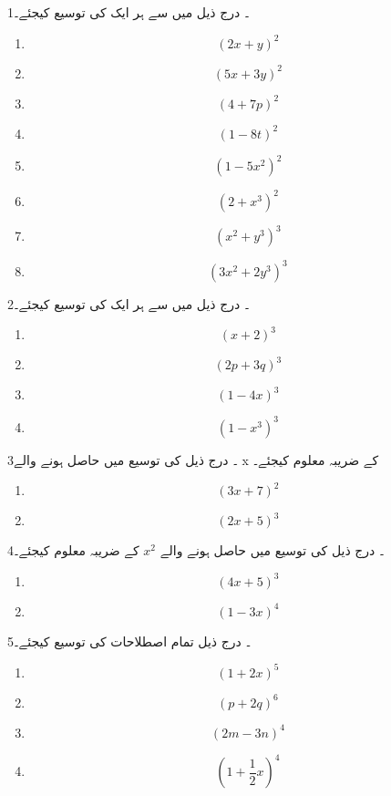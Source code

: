 1۔ درج ذیل میں سے ہر ایک کی توسیع کیجئے۔ 
\begin{multicols}{3}
\begin{enumerate}
\item
 \[ (2x+y)^{2}\]
 \item
    \[(5x+3y)^{2}\]
    \item
    \[(4+7p)^{2}\]
    \item
    \[(1-8t)^{2}\]
    \item
    \[(1-5x^{2})^{2}\]
    \item
    \[(2+x^{3})^{2}\]
    \item
   \[ (x^{2}+y^{3})^{3}\]
   \item
    \[(3x^{2}+2y^{3})^{3}\]
    \end{enumerate}
   \end{multicols}
2۔ درج ذیل میں سے ہر ایک کی توسیع کیجئے۔
\begin{multicols}{2}
  \begin{enumerate}
\item
   \[ (x+2)^{3}\]
   \item
   \[ (2p+3q)^{3}\]
   \item
    \[(1-4x)^{3}\]
    \item
    \[(1-x^3)^{3}\]
        \end{enumerate}
    \end{multicols}
3۔ درج ذیل کی توسیع میں حاصل ہونے والے x کے ضریبہ معلوم کیجئے۔ 
\begin{multicols}{2}
  \begin{enumerate}
  \item
       \[(3x+7)^{2}\]
       \item
   \[ (2x+5)^{3}\]
           \end{enumerate}
   \end{multicols}
4۔ درج ذیل کی توسیع میں حاصل ہونے والے
 \(x^{2}\)
  کے ضریبہ معلوم کیجئے۔ 
  \begin{multicols}{2}
   \begin{enumerate}
     \item
    \[(4x+5)^{3}\]
      \item
    \[(1-3x)^{4}\]
               \end{enumerate}
    \end{multicols}
5۔ درج ذیل تمام اصطلاحات کی توسیع کیجئے۔ 
\begin{multicols}{2}
 \begin{enumerate}
   \item
    \[(1+2x)^{5}\]
      \item
    \[(p+2q)^{6}\]
      \item
    \[(2m-3n)^{4}\]
      \item
    \[(1+\frac{1}{2}x)^{4}\]
      \end{enumerate}
   \end{multicols}
